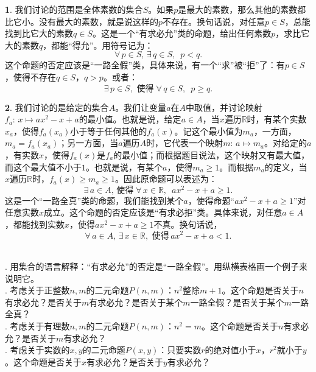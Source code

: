 \documentclass[12pt,UTF8,fontset=none]{ctexbook}
\begin{document}
\begin{so}
    \textbf{1}. 我们讨论的范围是全体素数的集合$S$。如果$p$是最大的素数，那么其他的素数都比它小。没有最大的素数，就是说这样的$p$不存在。换句话说，对任意$p\in S$，总能找到比它大的素数$q\in S$。这是一个“有求必允”类的命题，给出任何素数$p$，求比它大的素数$q$，都能“得允”。用符号记为：
    $$ \forall \, p \in S, \, \exists\, q\in S,\,\,\, p<q. $$
    这个命题的否定应该是“一路全假”类，具体来说，有一个“求”被“拒”了：有$p\in S$，使得不存在$q\in S$，$q > p$。或者：
    $$\exists \,p\in S, \,\,\mbox{使得}\;\forall\, q\in S,\,\,\, p\geqslant q.$$

    \textbf{2}. 我们讨论的是给定的集合$A$。我们让变量$a$在$A$中取值，并讨论映射$f_a:\, x\mapsto ax^2 - x + a$的最小值。也就是说，给定$a\in A$，当$x$遍历$\mathbb{R}$时，有某个实数$x_a$，使得$f_a(x_a)$小于等于任何其他的$f_a(x)$。记这个最小值为$m_a$，一方面，$m_a = f_a(x_a)$；另一方面，当$a$遍历$A$时，它代表一个映射$m:\,a\mapsto m_a$。对给定的$a$，有实数$x$，使得$f_a(x)$是$f_a$的最小值；而根据题目说法，这个映射又有最大值，而这个最大值不小于$1$。也就是说，有某个$a$，使得$m_a\geqslant 1$。而根据$m_a$的定义，当$x$遍历$\mathbb{R}$时，$f_a(x) \geqslant m_a\geqslant 1$。因此原命题可以表述为：
    $$\exists \,a\in A,\,\mbox{使得}\;\forall \,x\in\mathbb{R},\,\,\,ax^2-x+a\geqslant 1.$$
    这是一个“一路全真”类的命题，我们能找到某个$a$，使得命题“$ax^2-x+a\geqslant 1$”对任意实数$x$成立。这个命题的否定应该是“有求必拒”类。具体来说，对任意$a\in A$，都能找到实数$x$，使得$ax^2-x+a\geqslant 1$不真。换句话说，
    $$\forall \,a\in A,\,\exists\, x\in\mathbb{R},\,\,\mbox{使得}\,ax^2-x+a < 1.$$
\end{so}

\begin{xt}
    \mbox{}\\
    . 用集合的语言解释：“有求必允”的否定是“一路全假”。用纵横表格画一个例子来说明它。\\
    . 考虑关于正整数$n, m$的二元命题$P(n,m)$：$n^2$整除$m + 1$。这个命题是否关于$n$有求必允？是否关于$m$有求必允？是否关于某个$m$一路全假？是否关于某个$m$一路全真？\\
    . 考虑关于有理数$n, m$的二元命题$P(n,m)$：$n^2 = m$。这个命题是否关于$n$有求必允？是否关于$m$有求必允？\\
    . 考虑关于实数的$x, y$的二元命题$P(x, y)$：只要实数$r$的绝对值小于$x$，$r^2$就小于$y$。这个命题是否关于$x$有求必允？是否关于$y$有求必允？
\end{xt}

\end{document}

